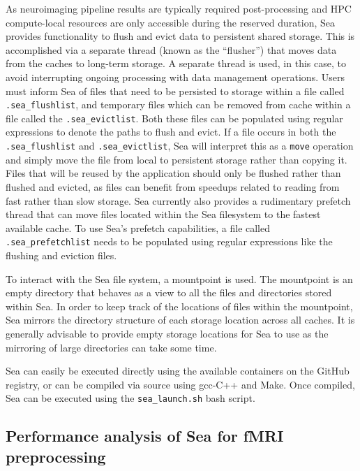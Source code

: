     As neuroimaging pipeline results are typically required post-processing and
    HPC compute-local resources are only accessible during the reserved
    duration, Sea provides functionality to flush and evict data to persistent
    shared storage. This is accomplished via a separate thread (known as the
    ``flusher'') that moves data from the caches to long-term storage. A
    separate thread is used, in this case, to avoid interrupting ongoing
    processing with data management operations. Users must inform Sea of files
    that need to be persisted to storage within a file called
    \texttt{.sea\_flushlist}, and temporary files which can be removed from
    cache within a file called the \texttt{.sea\_evictlist}. Both these files
    can be populated using regular expressions to denote the paths to flush and
    evict. If a file occurs in both the \texttt{.sea\_flushlist} and
    \texttt{.sea\_evictlist}, Sea will interpret this as a \texttt{move}
    operation and simply move the file from local to persistent storage rather
    than copying it. Files that will be reused by the application should only be
    flushed rather than flushed and evicted, as files can benefit from speedups
    related to reading from fast rather than slow storage. Sea currently also
    provides a rudimentary prefetch thread that can move files located within
    the Sea filesystem to the fastest available cache. To use Sea's prefetch
    capabilities, a file called \texttt{.sea\_prefetchlist} needs to be
    populated using regular expressions like the flushing and eviction files.
    
    To interact with the Sea file system, a mountpoint is used. The mountpoint
    is an empty directory that behaves as a view to all the files and
    directories stored within Sea. In order to keep track of the locations of
    files within the mountpoint, Sea mirrors the directory structure of each
    storage location across all caches. It is generally advisable to provide
    empty storage locations for Sea to use as the mirroring of large directories
    can take some time.
    
    Sea can easily be executed directly using the available containers on the
    GitHub registry, or can be compiled via source using gcc-C++ and Make. Once
    compiled, Sea can be executed using the \texttt{sea\_launch.sh} bash script.
    
    \subsection{Performance analysis of Sea for fMRI preprocessing}
    
